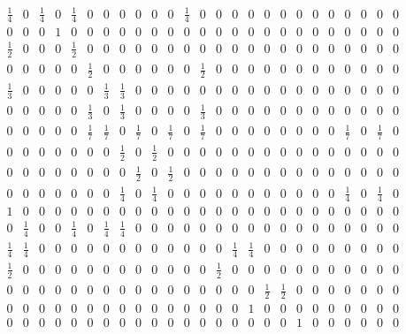 \documentclass[11pt]{report}
\begin{document}
\begin{appendices}
\begin{figure} [h!]
\begin{equation*}
\begin{array}{ccccccccccccccccccccccccc}
\frac{1}{4}&0&\frac{1}{4}&0&\frac{1}{4}&0&0&0&0&0&0&\frac{1}{4}&0&0&0&0&0&0&0&0&0&0&0&0&0\\

0&0&0&1&0&0&0&0&0&0&0&0&0&0&0&0&0&0&0&0&0&0&0&0&0\\

\frac{1}{2}&0&0&0&\frac{1}{2}&0&0&0&0&0&0&0&0&0&0&0&0&0&0&0&0&0&0&0&0\\

0&0&0&0&0&\frac{1}{2}&0&0&0&0&0&0&\frac{1}{2}&0&0&0&0&0&0&0&0&0&0&0&0\\

\frac{1}{3}&0&0&0&0&0&\frac{1}{3}&\frac{1}{3}&0&0&0&0&0&0&0&0&0&0&0&0&0&0&0&0&0\\

0&0&0&0&0&\frac{1}{3}&0&\frac{1}{3}&0&0&0&0&\frac{1}{3}&0&0&0&0&0&0&0&0&0&0&0&0\\

0&0&0&0&0&\frac{1}{7}&\frac{1}{7}&0&\frac{1}{7}&0&\frac{1}{7}&0&\frac{1}{7}&0&0&0&0&0&0&0&0&\frac{1}{7}&0&\frac{1}{7}&0\\

0&0&0&0&0&0&0&\frac{1}{2}&0&\frac{1}{2}&0&0&0&0&0&0&0&0&0&0&0&0&0&0&0\\

0&0&0&0&0&0&0&0&\frac{1}{2}&0&\frac{1}{2}&0&0&0&0&0&0&0&0&0&0&0&0&0&0\\

0&0&0&0&0&0&0&\frac{1}{4}&0&\frac{1}{4}&0&0&0&0&0&0&0&0&0&0&0&\frac{1}{4}&0&\frac{1}{4}&0\\

1&0&0&0&0&0&0&0&0&0&0&0&0&0&0&0&0&0&0&0&0&0&0&0&0\\

0&\frac{1}{4}&0&0&\frac{1}{4}&0&\frac{1}{4}&\frac{1}{4}&0&0&0&0&0&0&0&0&0&0&0&0&0&0&0&0&0\\

\frac{1}{4}&\frac{1}{4}&0&0&0&0&0&0&0&0&0&0&0&0&\frac{1}{4}&\frac{1}{4}&0&0&0&0&0&0&0&0&0\\

\frac{1}{2}&0&0&0&0&0&0&0&0&0&0&0&0&\frac{1}{2}&0&0&0&0&0&0&0&0&0&0&0\\

0&0&0&0&0&0&0&0&0&0&0&0&0&0&0&0&\frac{1}{2}&\frac{1}{2}&0&0&0&0&0&0&0\\

0&0&0&0&0&0&0&0&0&0&0&0&0&0&0&1&0&0&0&0&0&0&0&0&0\\

0&0&0&0&0&0&0&0&0&0&0&0&0&0&0&0&0&0&1&0&0&0&0&0&0\\


\end{array}
\end{equation*}
\end{figure}
\end{appendices}
\end{document}

